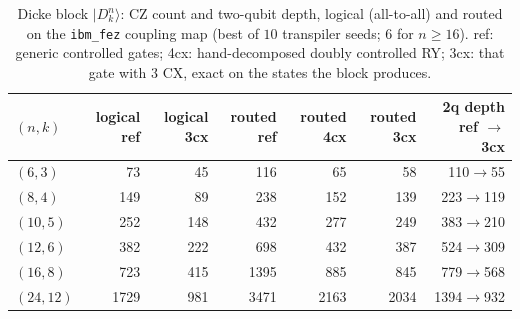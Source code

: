 \begin{table}[t]\centering\scriptsize\setlength{\tabcolsep}{3pt}
\caption{ Dicke block $|D^n_k\rangle$: CZ count and two-qubit depth, logical (all-to-all) and routed on the \texttt{ibm\_fez} coupling map (best of $10$ transpiler seeds; $6$ for $n\ge16$). ref: generic controlled gates; 4cx: hand-decomposed doubly controlled RY; 3cx: that gate with $3$ CX, exact on the states the block produces.}\label{tab:dicke_opt}
\begin{tabular}{lrrrrrr}\toprule
$(n,k)$ & logical ref & logical 3cx & routed ref & routed 4cx & routed 3cx & 2q depth ref $\to$ 3cx\\\midrule
$(6,3)$ & 73 & 45 & 116 & 65 & 58 & 110$\to$55\\
$(8,4)$ & 149 & 89 & 238 & 152 & 139 & 223$\to$119\\
$(10,5)$ & 252 & 148 & 432 & 277 & 249 & 383$\to$210\\
$(12,6)$ & 382 & 222 & 698 & 432 & 387 & 524$\to$309\\
$(16,8)$ & 723 & 415 & 1395 & 885 & 845 & 779$\to$568\\
$(24,12)$ & 1729 & 981 & 3471 & 2163 & 2034 & 1394$\to$932\\
\bottomrule\end{tabular}\end{table}
